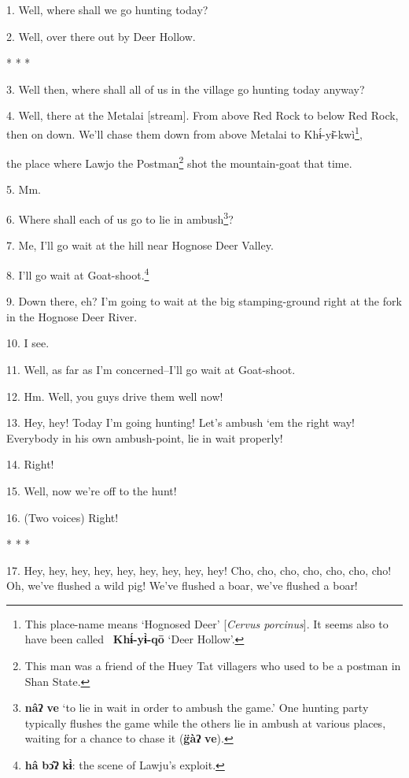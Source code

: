 \setcounter{footnote}{0}

1. Well, where shall we go hunting today?

2. Well, over there out by Deer Hollow.

\begin{center}
* * *
\end{center}

3. Well then, where shall all of us in the village go hunting today anyway?

4. Well, there at the Metalai [stream]. From above Red Rock to below Red Rock,
then on down. We'll chase them down from above Metalai to Khɨ́-yɨ̄-kwì\footnote{This place-name means `Hognosed Deer' [\textit{Cervus porcinus}]. It seems also to have been called ~\textbf{Khɨ́-yɨ̀-qō} `Deer Hollow'.},

the place where Lawjo the Postman\footnote{This man was a friend of the Huey Tat villagers who used to be a postman in Shan State.} shot the mountain-goat that time.

5. Mm.

6. Where shall each of us go to lie in ambush\footnote{\textbf{nâʔ} \textbf{ve} `to lie in wait in order to ambush the game.' One hunting party typically flushes the game while the others lie in ambush at various places, waiting for a chance to chase it (\textbf{g̈àʔ} \textbf{ve}).}?

7. Me, I'll go wait at the hill near Hognose Deer Valley.

8. I'll go wait at Goat-shoot.\footnote{\textbf{hâ} \textbf{bɔ̂ʔ} \textbf{kɨ̀}: the scene of Lawju's exploit.}

9. Down there, eh? I'm going to wait at the big stamping-ground right at the fork
in the Hognose Deer River.

10. I see.

11. Well, as far as I'm concerned--I'll go wait at Goat-shoot.

12. Hm. Well, you guys drive them well now!

13. Hey, hey! Today I'm going hunting! Let's ambush `em the right way! Everybody
in his own ambush-point, lie in wait properly!

14. Right!

15. Well, now we're off to the hunt!

16. (Two voices) Right!

\begin{center}
* * *
\end{center}

17. Hey, hey, hey, hey, hey, hey, hey, hey, hey! Cho, cho, cho, cho, cho, cho,
cho! Oh, we've flushed a wild pig! We've flushed a boar, we've flushed a boar!

